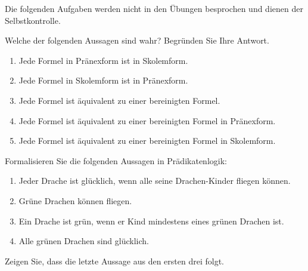 \documentclass[german]{latteachCD}[2017/03/28]
\begin{document}
\maketitle

\begin{mdframed}
  Die folgenden Aufgaben werden nicht in den Übungen besprochen und dienen der
  Selbstkontrolle.

  \renewcommand{\theexercise}{\Roman{exercise}}
  \setcounter{exercise}{3}

  \begin{exercise}
    Welche der folgenden Aussagen sind wahr?  Begründen Sie Ihre Antwort.
    \begin{enumerate}
    \item Jede Formel in Pränexform ist in Skolemform.
    \item Jede Formel in Skolemform ist in Pränexform.
    \item Jede Formel ist äquivalent zu einer bereinigten Formel.
    \item Jede Formel ist äquivalent zu einer bereinigten Formel in Pränexform.
    \item Jede Formel ist äquivalent zu einer bereinigten Formel in Skolemform.
    \end{enumerate}
  \end{exercise}

  \begin{exercise}
    Formalisieren Sie die folgenden Aussagen in Prädikatenlogik:
    \begin{enumerate}
    \item Jeder Drache ist glücklich, wenn alle seine Drachen-Kinder fliegen
      können.
    \item Grüne Drachen können fliegen.
    \item Ein Drache ist grün, wenn er Kind mindestens eines grünen Drachen ist.
    \item Alle grünen Drachen sind glücklich.
    \end{enumerate}
    Zeigen Sie, dass die letzte Aussage aus den ersten drei folgt.
  \end{exercise}
\end{mdframed}

\setcounter{exercise}{0}

\vspace*{\baselineskip}

\end{document}
